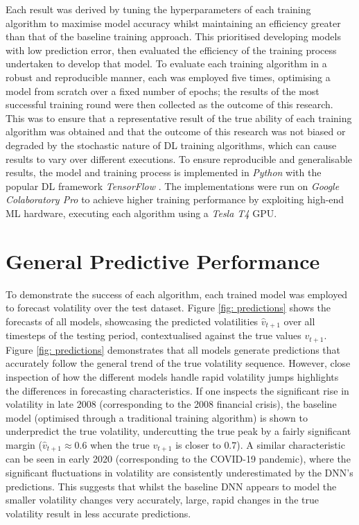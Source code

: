 \documentclass[a4paper, 11pt]{report}
\begin{document}
    Each result was derived by tuning the hyperparameters of each training algorithm to maximise model accuracy whilst maintaining an efficiency greater than that of the baseline training approach. This prioritised developing models with low prediction error, then evaluated the efficiency of the training process undertaken to develop that model. To evaluate each training algorithm in a robust and reproducible manner, each was employed five times, optimising a model from scratch over a fixed number of epochs; the results of the most successful training round were then collected as the outcome of this research. This was to ensure that a representative result of the true ability of each training algorithm was obtained and that the outcome of this research was not biased or degraded by the stochastic nature of DL training algorithms, which can cause results to vary over different executions. To ensure reproducible and generalisable results, the model and training process is implemented in \emph{Python} with the popular DL framework \emph{TensorFlow} \citep{abadi-2016}. The implementations were run on \emph{Google Colaboratory Pro} to achieve higher training performance by exploiting high-end ML hardware, executing each algorithm using a \emph{Tesla T4} GPU. 

    \section{General Predictive Performance}

    To demonstrate the success of each algorithm, each trained model was employed to forecast volatility over the test dataset. Figure \ref{fig: predictions} shows the forecasts of all models, showcasing the predicted volatilities $\hat{v}_{t+1}$ over all timesteps of the testing period, contextualised against the true values $v_{t+1}$. Figure \ref{fig: predictions} demonstrates that all models  generate predictions that accurately follow the general trend of the true volatility sequence. However, close inspection of how the different models handle rapid volatility jumps highlights the differences in forecasting characteristics. If one inspects the significant rise in volatility in late 2008 (corresponding to the 2008 financial crisis), the baseline model (optimised through a traditional training algorithm) is shown to underpredict the true volatility, undercutting the true peak by a fairly significant margin ($\hat{v}_{t+1} \approx 0.6$ when the true $v_{t+1}$ is closer to $0.7$). A similar characteristic can be seen in early 2020 (corresponding to the COVID-19 pandemic), where the significant fluctuations in volatility are consistently underestimated by the DNN's predictions. This suggests that whilst the baseline DNN appears to model the smaller volatility changes very accurately, large, rapid changes in the true volatility result in less accurate predictions. 
\end{document}
